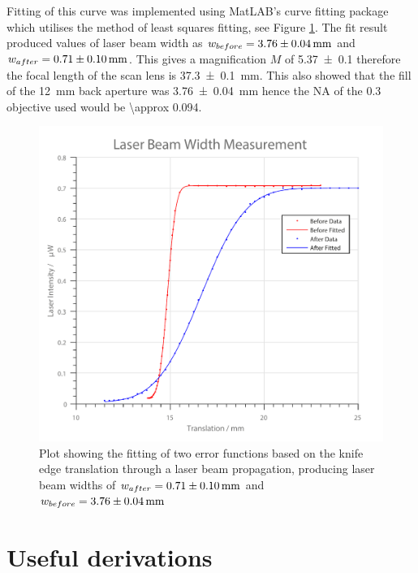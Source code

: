 Fitting of this curve was implemented using MatLAB's curve fitting package which utilises the method of least squares fitting, see Figure \ref{fig:laser_width}.
The fit result produced values of laser beam width as $w_{before} = \SI{3.76\pm0.04}{\milli\meter}$ and $w_{after} = \SI{0.71\pm0.1}{\milli\meter}$.
This gives a magnification $M$ of \SI{5.37 \pm 0.1}{} therefore the focal length of the scan lens is \SI{37.3\pm0.1}{\milli\meter}.
This also showed that the fill of the \SI{12}{\milli\meter} back aperture was \SI{3.76\pm0.04}{\milli\meter} hence the NA of the \num{0.3} objective used would be \SI{\approx 0.094}{}.

\begin{figure}
\centering
\includegraphics[width=0.7\linewidth]{./laser_width}
\caption[Laser Width Fitting]{Plot showing the fitting of two error functions based on the knife edge translation through a laser beam propagation, producing laser beam widths of $w_{after} = \SI{0.71\pm0.1}{\milli\meter}$ and $w_{before} = \SI{3.76\pm0.04}{\milli\meter}$}
\label{fig:laser_width}
\end{figure}


\chapter{Useful derivations}
